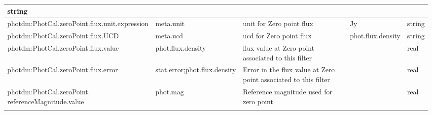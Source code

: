 \documentclass[11pt,a4paper]{ivoa}
\begin{document}
\begin{appendices}
\begin{table}[H]
\begin{adjustbox}{angle=90}
\begin{tabular}{p{2.5in}|p{1.5in}|p{2in}|p{0.74in}|p{0.35in}}
\multicolumn{1}{p{0.35in}}{{\fontsize{8pt}{8pt}\selectfont string}} \\
\hline
\multicolumn{1}{p{2.5in}}{{\fontsize{8pt}{8pt}
\selectfont photdm:PhotCal.zeroPoint.\-flux.unit.expression}} &
\multicolumn{1}{p{1.5in}}{{\fontsize{8pt}{8pt}\selectfont meta.unit }} &
\multicolumn{1}{p{2in}}{{\fontsize{8pt}{8pt}\selectfont unit for Zero point flux}} &
\multicolumn{1}{p{0.74in}}{{\fontsize{8pt}{8pt}\selectfont Jy}} &
\multicolumn{1}{p{0.35in}}{{\fontsize{8pt}{8pt}\selectfont string}} \\
\hline
\multicolumn{1}{p{2.5in}}{{\fontsize{8pt}{8pt}\selectfont photdm:PhotCal.zeroPoint.\-flux.UCD}} &
\multicolumn{1}{p{1.5in}}{{\fontsize{8pt}{8pt}\selectfont meta.ucd }} &
\multicolumn{1}{p{2in}}{{\fontsize{8pt}{8pt}\selectfont ucd for Zero point flux}} &
\multicolumn{1}{p{0.74in}}{{\fontsize{8pt}{8pt}\selectfont phot.flux.density}} &
\multicolumn{1}{p{0.35in}}{{\fontsize{8pt}{8pt}\selectfont string}} \\
\hline
\multicolumn{1}{p{2.5in}}{{\fontsize{8pt}{8pt}\selectfont photdm:PhotCal.zeroPoint.\-flux.value}} &
\multicolumn{1}{p{1.5in}}{{\fontsize{8pt}{8pt}\selectfont phot.flux.density }} &
\multicolumn{1}{p{2in}}{{\fontsize{8pt}{8pt}\selectfont flux value at Zero point associated
to this filter}} &
\multicolumn{1}{p{0.74in}}{} &
\multicolumn{1}{p{0.35in}}{{\fontsize{8pt}{8pt}\selectfont real}} \\
\hline
\multicolumn{1}{p{2.5in}}{{\fontsize{8pt}{8pt}\selectfont photdm:PhotCal.zeroPoint.\-flux.error}} &
\multicolumn{1}{p{1.5in}}{{\fontsize{8pt}{8pt}\selectfont stat.error;phot.flux.density}} &
\multicolumn{1}{p{2in}}{{\fontsize{8pt}{8pt}\selectfont Error in the flux value at Zero point
associated to this filter}} &
\multicolumn{1}{p{0.74in}}{} &
\multicolumn{1}{p{0.35in}}{{\fontsize{8pt}{8pt}\selectfont real}} \\
\hline
\multicolumn{1}{p{2.5in}}{{\fontsize{8pt}{8pt}
\selectfont photdm:PhotCal.zeroPoint.\newline referenceMagnitude.value}} &
\multicolumn{1}{p{1.5in}}{{\fontsize{8pt}{8pt}\selectfont phot.mag}} &
\multicolumn{1}{p{2in}}{{\fontsize{8pt}{8pt}\selectfont Reference magnitude used for zero point}} &
\multicolumn{1}{p{0.74in}}{{\fontsize{8pt}{8pt}\selectfont 0.0}} &
\multicolumn{1}{p{0.35in}}{{\fontsize{8pt}{8pt}\selectfont real} \par } \\
\hline
\multicolumn{1}{p{2.5in}}{{\fontsize{8pt}{8pt}
}}
\end{tabular}
\end{adjustbox}
\end{table}
\end{appendices}
\end{document}
